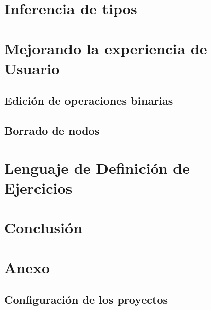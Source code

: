 \section{Inferencia de tipos}

\section{Mejorando la experiencia de Usuario}

\subsection{Edición de operaciones binarias}
\subsection{Borrado de nodos}

\section{Lenguaje de Definición de Ejercicios}

\section{Conclusión}

\section{Anexo}
\subsection{Configuración de los proyectos}



